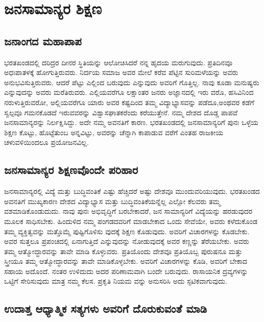 
\chapter{ಜನಸಾಮಾನ್ಯರ ಶಿಕ್ಷಣ}

\section{ಜನಾಂಗದ ಮಹಾಪಾಪ}

ಭರತಖಂಡದಲ್ಲಿ ದರಿದ್ರರ ದೀನರ ಸ್ಥಿತಿಯನ್ನು ಆಲೋಚಿಸಿದರೆ ನನ್ನ ಹೃದಯ ಮರುಗುವುದು. ಪ್ರತಿದಿನವೂ ಅಧಃಪಾತಳಕ್ಕೆ ಹೋಗುತ್ತಿರುವರು. ನಿರ್ದಯ ಸಮಾಜ ಅವರ ಮೇಲೆ ಕರೆವ ಪೆಟ್ಟಿನ ಸುರಿಮಳೆಯನ್ನು ಅವರು ಅನುಭವಿಸುತ್ತಿರುವರು. ಆದರೆ ಪೆಟ್ಟು ಎಲ್ಲಿಂದ ಬರುವುದು ಎನ್ನುವುದು ಅವರಿಗೆ ಗೊತ್ತಿಲ್ಲ. ನಾವು ಕೂಡಾ ಮನುಷ್ಯರು ಎನ್ನುವುದನ್ನು ಅವರು ಮರೆತಿರುವರು. ಎಲ್ಲಿಯವರೆಗೂ ಲಕ್ಷಾಂತರ ಜನರು ಅಜ್ಞಾನದಲ್ಲಿ ಇರು ವರೊ, ಹಸಿವಿನಿಂದ ನರುಳುತ್ತಿರುವರೋ, ಅಲ್ಲಿಯವರೆಗೂ ಯಾರು ಅವರ ಕಷ್ಟದಿಂದ ತಮ್ಮ ವಿದ್ಯಾಭ್ಯಾಸವನ್ನು ಪಡೆದೂ,ಅಂಥವರ ಕಡೆಗೆ ಸ್ವಲ್ಪವೂ ಗಮನಕೊಡದೆ ಇರುವವರನ್ನು ವಿಶ್ವಾಸಘಾತಕರೆಂದು ಕರೆಯುತ್ತೇನೆ. ನಮ್ಮ ದೇಶದ ದೊಡ್ಡ ಪಾಪವೆ ಜನಸಾಮಾನ್ಯರನ್ನು ನಿರ್ಲಕ್ಷಿಸಿದ್ದು. ಅದೇ ನಮ್ಮ ಅವನತಿಗೆ ಕಾರಣ. ಭರತಖಂಡದಲ್ಲಿ ಜನಸಾಮಾನ್ಯರಿಗೆ ಪುನಃ ಒಳ್ಳೆಯ ಶಿಕ್ಷಣ ಕೊಟ್ಟು, ಹೊಟ್ಟೆತುಂಬ ಅನ್ನವಿಟ್ಟು, ಅವರನ್ನು ಚೆನ್ನಾಗಿ ಕಾಪಾಡುವ ವರೆಗೆ ಎಂತಹ ರಾಜಕೀಯ ಚಳುವಳಿಯಿಂದಲೂ ಪ್ರಯೋಜನವಿಲ್ಲ.


\section{ಜನಸಾಮಾನ್ಯರ ಶಿಕ್ಷಣವೊಂದೇ ಪರಿಹಾರ}

ಜನಸಾಮಾನ್ಯರಲ್ಲಿ ವಿದ್ಯೆ ಮತ್ತು ಬುದ್ಧಿವಂತಿಕೆ ಎಷ್ಟು ಹೆಚ್ಚಿದರೆ ಅಷ್ಟು ದೇಶವೂ ಮುಂದುವರಿಯುವುದು. ಭರತಖಂಡದ ಅವನತಿಗೆ ಮುಖ್ಯಕಾರಣ ದೇಶದ ವಿದ್ಯಾಭ್ಯಾಸ ಮತ್ತು ಬುದ್ಧಿವಂತಿಕೆಯನ್ನೆಲ್ಲ ಎಲ್ಲೋ ಕೆಲವರು ತಮ್ಮ ವಶಮಾಡಿಕೊಂಡುದುದು. ನಾವು ಪುನಃ ಅಭಿವೃದ್ಧಿಗೆ ಬರಬೇಕಾದರೆ, ಜನ ಸಾಮಾನ್ಯರಿಗೆ ವಿದ್ಯೆಯನ್ನು ಹರಡುವುದರ ಮೂಲಕ ಸಾಧಿಸಬೇಕು. ಹಿಂದುಳಿದ ನಮ್ಮ ಪಂಗಡದವರಿಗೆ ಮಾಡಬೇಕಾದ ಒಂದು ಸೇವೆಯೇ, ಅವರು ಕಳೆದುಕೊಂಡ ತಮ್ಮ ವ್ಯಕ್ತಿತ್ವವನ್ನು ಮತ್ತೊಮ್ಮೆ ಪುಷ್ಟಿಗೊಳಿಸು ವುದಕ್ಕೆ ಶಿಕ್ಷಣ ಕೊಡುವುದು. ಅವರಿಗೆ ವಿಚಾರಗಳನ್ನು ಕೊಡಬೇಕು. ಅವರ ಸುತ್ತಲೂ ಪ್ರಪಂಚದಲ್ಲಿ ಏನಾಗುತ್ತಿದೆ ಎನ್ನುವುದನ್ನು ನೋಡುವುದಕ್ಕೆ ಅವರ ಕಣ್ಣನ್ನು ತೆರೆಯಬೇಕು. ಅವರು ತಮ್ಮ ಆತ್ಮೋದ್ಧಾರವನ್ನು ತಾವೇ ಮಾಡಿ ಕೊಳ್ಳುವರು. ಪ್ರತಿಯೊಂದು ದೇಶವೂ ಪ್ರತಿಯೊಬ್ಬ ಪುರುಷನೂ ಮತ್ತು ಸ್ತ್ರೀಯೂ ತಮ್ಮ ಆತ್ಮೋದ್ಧಾರವನ್ನು ತಾವೇ ಮಾಡಿಕೊಳ್ಳಬೇಕು. ಅವರಿಗೆ ವಿಚಾರಗಳನ್ನು ಕೊಡಿ, ಅವರಿಗೆ ಬೇಕಾದ ಸಹಾಯ ಅದೊಂದೆ. ನಂತರ ಉಳಿದುದು ಅದರ ಪರಿಣಾಮವಾಗಿ ಬಂದೇ ಬರುವುದು. ರಾಸಾಯನಿಕ ದ್ರವ್ಯಗಳನ್ನು ಒಟ್ಟಿಗೆ ಸೇರಿಸುವುದು ಮಾತ್ರ ನಮ್ಮ ಕೆಲಸ. ಪ್ರಕೃತಿ ನಿಯಮ ವನ್ನು ಅನುಸರಿಸಿ ಅದು ಸ್ಫಟಿಕವಾಗುವುದು.


\section{ಉದಾತ್ತ ಆಧ್ಯಾತ್ಮಿಕ ಸತ್ಯಗಳು ಅವರಿಗೆ ದೊರುಕುವಂತೆ ಮಾಡಿ}

